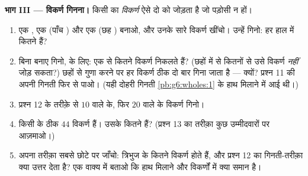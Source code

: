 \begin{problem}
\medskip
\noindent\textbf{भाग III --- विकर्ण गिनना।}
किसी  का \emph{विकर्ण} ऐसे दो  को जोड़ता है जो
पड़ोसी न हों।
\begin{enumerate}[resume]
  \item एक , एक  (पाँच ) और एक  (छह
        ) बनाओ, और उनके सारे विकर्ण खींचो। उन्हें गिनो: हर
        हाल में कितने हैं?
  \item बिना बनाए गिनो,  के लिए: एक  से कितने विकर्ण
        निकलते हैं? (छहों  में से कितनों से उसे विकर्ण
        \emph{नहीं} जोड़ सकता?) छहों  से गुणा करने पर हर
        विकर्ण ठीक दो बार गिना जाता है --- क्यों? प्रश्न 11 की
        अपनी गिनती फिर से पाओ। (यही दोहरी गिनती
        \cref{pb:g6:wholes:1} के हाथ मिलाने में आई थी।)
  \item प्रश्न 12 के तरीक़े से $10$  वाले  के, फिर
        $20$  वाले  के विकर्ण गिनो।
  \item किसी  के ठीक $44$ विकर्ण हैं। उसके कितने 
        हैं? (प्रश्न 13 का तरीक़ा कुछ उम्मीदवारों पर
        आज़माओ।)
  \item अपना तरीक़ा सबसे छोटे  पर जाँचो: त्रिभुज के कितने
        विकर्ण होते हैं, और प्रश्न 12 का गिनती-तरीक़ा क्या उत्तर
        देता है? एक वाक्य में बताओ कि हाथ मिलाने और विकर्णों में
        क्या समान है।
\end{enumerate}
\end{problem}
